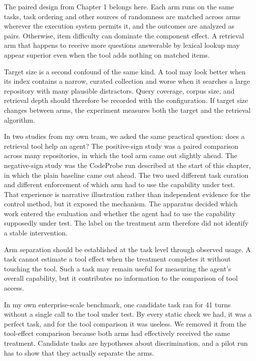 The paired design from Chapter 1 belongs here. Each arm runs on the same tasks, task ordering and other sources of randomness are matched across arms wherever the execution system permits it, and the outcomes are analyzed as pairs. Otherwise, item difficulty can dominate the component effect. A retrieval arm that happens to receive more questions answerable by lexical lookup may appear superior even when the tool adds nothing on matched items.

Target size is a second confound of the same kind. A tool may look better when its index contains a narrow, curated collection and worse when it searches a large repository with many plausible distractors. Query coverage, corpus size, and retrieval depth should therefore be recorded with the configuration. If target size changes between arms, the experiment measures both the target and the retrieval algorithm.

In two studies from my own team, we asked the same practical question: does a retrieval tool help an agent? The positive-sign study was a paired comparison across many repositories, in which the tool arm came out slightly ahead. The negative-sign study was the CodeProbe run described at the start of this chapter, in which the plain baseline came out ahead. The two used different task curation and different enforcement of which arm had to use the capability under test. That experience is narrative illustration rather than independent evidence for the control method, but it exposed the mechanism. The apparatus decided which work entered the evaluation and whether the agent had to use the capability supposedly under test. The label on the treatment arm therefore did not identify a stable intervention.

Arm separation should be established at the task level through observed usage. A task cannot estimate a tool effect when the treatment completes it without touching the tool. Such a task may remain useful for measuring the agent's overall capability, but it contributes no information to the comparison of tool access.

In my own enterprise-scale benchmark, one candidate task ran for 41 turns without a single call to the tool under test. By every static check we had, it was a perfect task, and for the tool comparison it was useless. We removed it from the tool-effect comparison because both arms had effectively received the same treatment. Candidate tasks are hypotheses about discrimination, and a pilot run has to show that they actually separate the arms.

